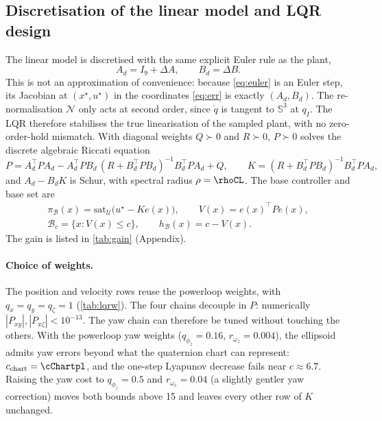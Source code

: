 \documentclass[11pt,a4paper]{article}
\newcommand{\B}{\mathcal{B}}
\newcommand{\U}{\mathcal{U}}
\begin{document}
\subsection{Discretisation of the linear model and LQR design}
The linear model is discretised with the same explicit Euler rule as the plant,
\begin{equation}
A_d=I_9+\Delta A,\qquad B_d=\Delta B .
\end{equation}
This is not an approximation of convenience: because \eqref{eq:euler} is an Euler step, its Jacobian at
$(x^\star,u^\star)$ in the coordinates \eqref{eq:err} is exactly $(A_d,B_d)$. The re-normalisation
$\mathcal{N}$ only acts at second order, since $\dot q$ is tangent to $\mathbb{S}^3$ at $q_I$. The LQR
therefore stabilises the true linearisation of the sampled plant, with no zero-order-hold mismatch.
With diagonal weights $Q\succ0$ and $R\succ0$, $P\succ0$ solves the discrete algebraic Riccati equation
\begin{equation}
P=A_d^\top PA_d-A_d^\top PB_d\,(R+B_d^\top PB_d)^{-1}B_d^\top PA_d+Q,\qquad
K=(R+B_d^\top PB_d)^{-1}B_d^\top PA_d,
\end{equation}
and $A_d-B_dK$ is Schur, with spectral radius $\rho=\rhoCL$. The base controller and base set are
\begin{equation}
\begin{gathered}
\pi_{\B}(x)=\mathrm{sat}_{\U}\big(u^\star-Ke(x)\big),\qquad V(x)=e(x)^\top Pe(x),\\
\B_c=\{x:V(x)\le c\},\qquad h_{\B}(x)=c-V(x).
\end{gathered}
\label{eq:base}
\end{equation}
The gain is listed in \cref{tab:gain} (Appendix).

\paragraph{Choice of weights.}
The position and velocity rows reuse the powerloop weights, with $q_x=q_y=q_\zeta=1$
(\cref{tab:lqrw}). The four chains decouple in $P$: numerically $|P_{xy}|,|P_{x\zeta}|<10^{-13}$. The yaw
chain can therefore be tuned without touching the others. With the powerloop yaw weights
($q_{\phi_z}=0.16$, $r_{\omega_z}=0.004$), the ellipsoid admits yaw errors beyond what the quaternion chart
can represent: $c_{\mathrm{chart}}=\cChartpl$, and the one-step Lyapunov decrease fails near $c\approx6.7$.
Raising the yaw cost to $q_{\phi_z}=0.5$ and $r_{\omega_z}=0.04$ (a slightly gentler yaw correction) moves
both bounds above 15 and leaves every other row of $K$ unchanged.
\end{document}
